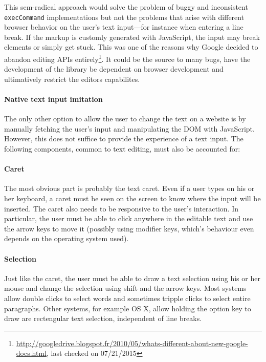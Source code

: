 This sem-radical approach would solve the problem of buggy and inconsistent \texttt{execCommand} implementations but not the problems that arise with different browser behavior on the user's text input---for instance when entering a line break. If the markup is customly generated with JavaScript, the input may break elements or simply get stuck. This was one of the reasons why Google decided to abandon editing APIs entirely\footnote{\url{http://googledrive.blogspot.fr/2010/05/whats-different-about-new-google-docs.html}, last checked on 07/21/2015}. It could be the source to many bugs, have the development of the library be dependent on browser development and ultimatively restrict the editors capabilites.

\paragraph{Native text input imitation} The only other option to allow the user to change the text on a website is by manually fetching the user's input and manipulating the DOM with JavaScript. However, this does not suffice to provide the experience of a text input. The following components, common to text editing, must also be accounted for:



\paragraph{Caret} The most obvious part is probably the text caret. Even if a user types on his or her keyboard, a caret must be seen on the screen to know where the input will be inserted. The caret also needs to be responsive to the user's interaction. In particular, the user must be able to click anywhere in the editable text and use the arrow keys to move it (possibly using modifier keys, which's behaviour even depends on the operating system used).

\paragraph{Selection} Just like the caret, the user must be able to draw a text selection using his or her mouse and change the selection using shift and the arrow keys. Most systems allow double clicks to select words and sometimes tripple clicks to select entire paragraphs. Other systems, for example OS X, allow holding the option key to draw are rectengular text selection, independent of line breaks.

